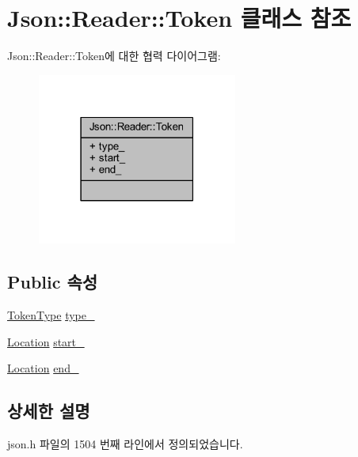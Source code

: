 \hypertarget{class_json_1_1_reader_1_1_token}{}\section{Json\+:\+:Reader\+:\+:Token 클래스 참조}
\label{class_json_1_1_reader_1_1_token}


Json\+:\+:Reader\+:\+:Token에 대한 협력 다이어그램\+:\nopagebreak
\begin{figure}[H]
\begin{center}
\leavevmode
\includegraphics[width=186pt]{class_json_1_1_reader_1_1_token__coll__graph}
\end{center}
\end{figure}
\subsection*{Public 속성}
\begin{DoxyCompactItemize}
\item 
\hyperlink{class_json_1_1_reader_aa35e6ab574dc399a0a645ad98ed66bc9}{Token\+Type} \hyperlink{class_json_1_1_reader_1_1_token_aa0f06d0105ec3d8cb42427c66b991bad}{type\+\_\+}
\item 
\hyperlink{class_json_1_1_reader_a46795b5b272bf79a7730e406cb96375a}{Location} \hyperlink{class_json_1_1_reader_1_1_token_aff87d677b9ac4b52542a00b0d6673249}{start\+\_\+}
\item 
\hyperlink{class_json_1_1_reader_a46795b5b272bf79a7730e406cb96375a}{Location} \hyperlink{class_json_1_1_reader_1_1_token_a7d3bc0fa40097f435d184be4b1fd5ae1}{end\+\_\+}
\end{DoxyCompactItemize}


\subsection{상세한 설명}


json.\+h 파일의 1504 번째 라인에서 정의되었습니다.



